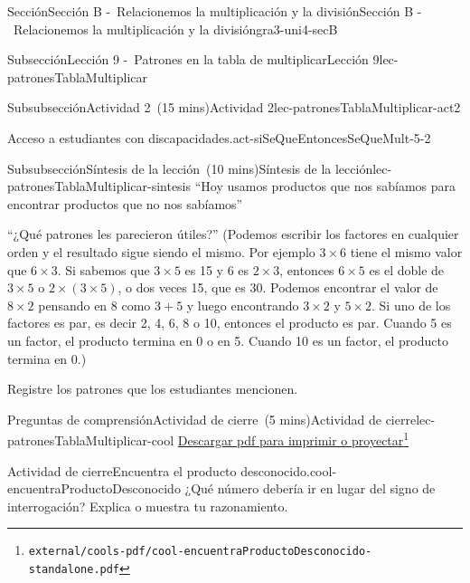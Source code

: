 \documentclass[oneside,10pt,]{article}
\begin{document}
\begin{sectionptx}{Sección}{Sección B -~Relacionemos la multiplicación y la división}{}{Sección B -~Relacionemos la multiplicación y la división}{}{}{gra3-uni4-secB}
\begin{subsectionptx}{Subsección}{Lección 9 -~Patrones en la tabla de multiplicar}{}{Lección 9}{}{}{lec-patronesTablaMultiplicar}
\begin{subsubsectionptx}{Subsubsección}{Actividad 2~(15 mins)}{}{Actividad 2}{}{}{lec-patronesTablaMultiplicar-act2}
\begin{paragraphs}{Acceso a estudiantes con discapacidades.}{act-siSeQueEntoncesSeQueMult-5-2}
\end{paragraphs}%
\end{subsubsectionptx}
%
%
\typeout{************************************************}
\typeout{************************************************}
%
\begin{subsubsectionptx}{Subsubsección}{Síntesis de la lección~(10 mins)}{}{Síntesis de la lección}{}{}{lec-patronesTablaMultiplicar-sintesis}
``Hoy usamos productos que nos sabíamos para encontrar productos que no nos sabíamos''%
\par
``¿Qué patrones les parecieron útiles?'' (Podemos escribir los factores en cualquier orden y el resultado sigue siendo el mismo. Por ejemplo \(3 \times 6\) tiene el mismo valor que \(6 \times 3\). Si sabemos que \(3 \times 5\) es 15 y 6 es \(2 \times 3\), entonces \(6 \times 5\) es el doble de \(3 \times 5\) o \(2 \times (3 \times 5)\), o dos veces 15, que es 30. Podemos encontrar el valor de \(8 \times 2\) pensando en 8 como \(3 + 5\) y luego encontrando \(3 \times 2\) y \(5 \times 2\). Si uno de los factores es par, es decir 2, 4, 6, 8 o 10, entonces el producto es par. Cuando 5 es un factor, el producto termina en 0 o en 5. Cuando 10 es un factor, el producto termina en 0.)%
\par
Registre los patrones que los estudiantes mencionen.%
\end{subsubsectionptx}
%
%
\typeout{************************************************}
\typeout{************************************************}
%
\begin{reading-questions-subsubsection}{Preguntas de comprensión}{Actividad de cierre~(5 mins)}{}{Actividad de cierre}{}{}{lec-patronesTablaMultiplicar-cool}
\href{external/cools-pdf/cool-encuentraProductoDesconocido-standalone.pdf}{Descargar pdf para imprimir o proyectar}\footnote{\nolinkurl{external/cools-pdf/cool-encuentraProductoDesconocido-standalone.pdf}\label{lec-patronesTablaMultiplicar-cool-5}}\begin{project}{Actividad de cierre}{Encuentra el producto desconocido.}{cool-encuentraProductoDesconocido}%
¿Qué número debería ir en lugar del signo de interrogación? Explica o muestra tu razonamiento.%
\begin{image}{0}{1}{0}{}%

\end{image}
\end{project}
\end{reading-questions-subsubsection}
\end{subsectionptx}
\end{sectionptx}
\end{document}
